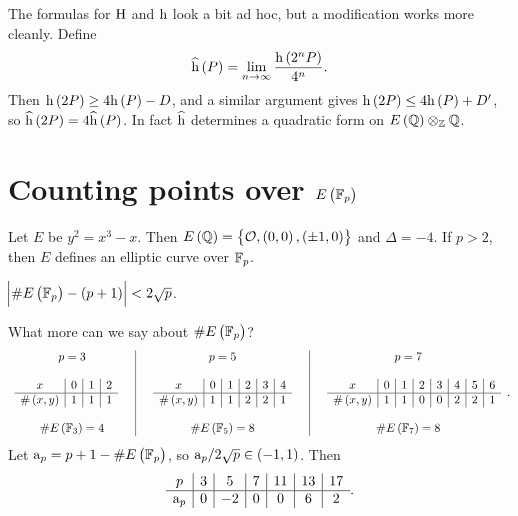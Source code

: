 \begin{remark}
The formulas for $ \mathrm{H} $ and $ \mathrm{h} $ look a bit ad hoc, but a modification works more cleanly. Define
$$ \widehat{\h}\br{P} = \lim_{n \to \infty} \dfrac{\h\br{2^nP}}{4^n}. $$
Then $ \h\br{2P} \ge 4\h\br{P} - D $, and a similar argument gives $ \h\br{2P} \le 4\h\br{P} + D' $, so $ \widehat{\h}\br{2P} = 4\widehat{\h}\br{P} $. In fact $ \widehat{\mathrm{h}} $ determines a quadratic form on $ E\br{\QQ} \otimes_\ZZ \QQ $.
\end{remark}

\pagebreak

\section{Counting points over \texorpdfstring{$ E\br{\FF_p} $}{E(Fp)}}


Let $ E $ be $ y^2 = x^3 - x $. Then $ E\br{\QQ} = \cbr{\OOO, \br{0, 0}, \br{\pm 1, 0}} $ and $ \Delta = -4 $. If $ p > 2 $, then $ E $ defines an elliptic curve over $ \mathbb{F}_p $.

\begin{theorem}[Hasse 1933]
$ \abs{\#E\br{\FF_p} - \br{p + 1}} < 2\sqrt{p} $.
\end{theorem}

What more can we say about $ \#E\br{\FF_p} $?
$$
\begin{array}{c|c|c}
p = 3 & p = 5 & p = 7 \\
& & \\
\begin{array}{c|c|c|c}
x & 0 & 1 & 2 \\
\hline
\#\br{x, y} & 1 & 1 & 1
\end{array}
\quad & \quad
\begin{array}{c|c|c|c|c|c}
x & 0 & 1 & 2 & 3 & 4 \\
\hline
\#\br{x, y} & 1 & 1 & 2 & 2 & 1
\end{array}
\quad & \quad
\begin{array}{c|c|c|c|c|c|c|c}
x & 0 & 1 & 2 & 3 & 4 & 5 & 6 \\
\hline
\#\br{x, y} & 1 & 1 & 0 & 0 & 2 & 2 & 1
\end{array}
\\
& & \\
\#E\br{\FF_3} = 4 & \#E\br{\FF_5} = 8 & \#E\br{\FF_7} = 8
\end{array}.
$$
Let $ \a_p = p + 1 - \#E\br{\FF_p} $, so $ \a_p / 2\sqrt{p} \in \br{-1, 1} $. Then
$$
\begin{array}{c|c|c|c|c|c|c}
p & 3 & 5 & 7 & 11 & 13 & 17 \\
\hline
\mathrm{a}_p & 0 & -2 & 0 & 0 & 6 & 2
\end{array}.
$$

